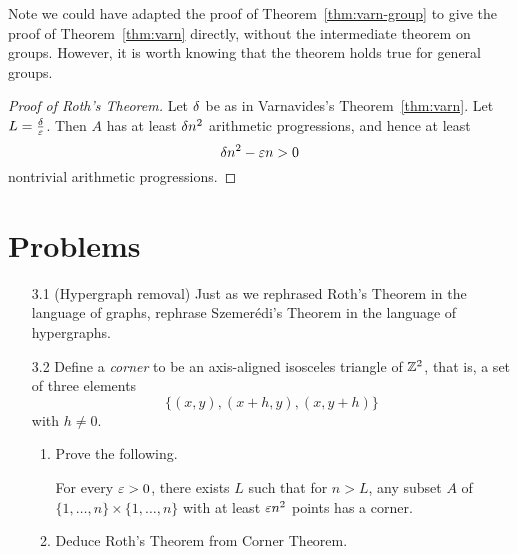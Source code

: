 Note we could have adapted the proof of Theorem~\ref{thm:varn-group} to give the proof of Theorem~\ref{thm:varn} directly, without the intermediate theorem on groups. However, it is worth knowing that the theorem holds true for general groups.

\begin{proof}[Proof of Roth's Theorem]
Let $\delta$ be as in Varnavides's Theorem~\ref{thm:varn}. Let $L=\frac{\delta}{\varepsilon}$. Then $A$ has at least $\delta n^2$ arithmetic progressions, and hence at least
\[
\delta n^2-\varepsilon n>0
\]
nontrivial arithmetic progressions.
\end{proof}
\section{Problems}
\begin{enumerate}
\item[3.1] (Hypergraph removal)
Just as we rephrased Roth's Theorem in the language of graphs, rephrase Szemer\'edi's Theorem in the language of hypergraphs.
\item[3.2]
Define a {\it corner}  to be an axis-aligned isosceles triangle of $\mathbb{Z}^2$, that is, a set of three elements
\[
\{(x,y),(x+h,y),(x,y+h)\}
\]
with $h\ne 0$.

\begin{enumerate}
\item
Prove the following.
\begin{thm}
For every $\varepsilon>0$, there exists $L$ such that for $n>L$, any subset $A$ of $\{1,\ldots, n\}\times \{1,\ldots, n\}$ with at least $\varepsilon n^2$ points has a corner.
\end{thm}
\item
Deduce Roth's Theorem from Corner Theorem.
\end{enumerate}
\end{enumerate}

\pagebreak

